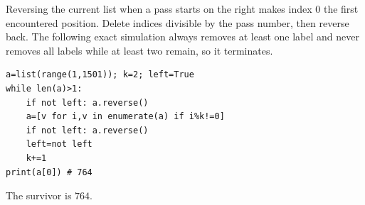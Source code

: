 Reversing the current list when a pass starts on the right makes index 0 the first encountered position. Delete indices divisible by the pass number, then reverse back. The following exact simulation always removes at least one label and never removes all labels while at least two remain, so it terminates.\begin{verbatim}
a=list(range(1,1501)); k=2; left=True
while len(a)>1:
    if not left: a.reverse()
    a=[v for i,v in enumerate(a) if i%k!=0]
    if not left: a.reverse()
    left=not left
    k+=1
print(a[0]) # 764
\end{verbatim}
The survivor is $\boxed{764}$.
